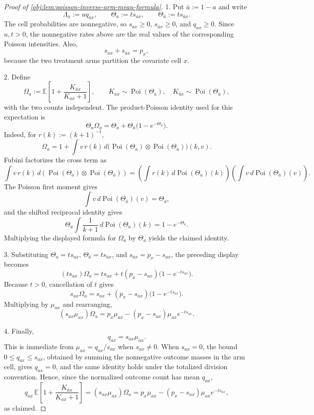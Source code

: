 \documentclass[11pt]{article}
\begin{document}
\begin{proof}[Proof of \cref{obj:lem:poisson-inverse-arm-mean-formula}]
1.  Put \(\bar a:=1-a\) and write
\[
\Lambda_a:=u q_{ax},\qquad
\Theta_a:=t s_{ax},\qquad
\Theta_{\bar a}:=t s_{\bar a x}.
\]
The cell probabilities are nonnegative, so \(s_{ax}\ge0\), \(s_{\bar a x}\ge0\), and \(q_{ax}\ge0\). Since \(u,t>0\), the nonnegative rates above are the real values of the corresponding Poisson intensities. Also,
\[
s_{ax}+s_{\bar a x}=p_x,
\]
because the two treatment arms partition the covariate cell \(x\). %

2.  Define
\[
\Omega_a:=
\mathbb E\!\left[
1+\frac{K_{\bar a x}}{K_{ax}+1}
\right],
\qquad
K_{ax}\sim\operatorname{Poi}(\Theta_a),\quad
K_{\bar a x}\sim\operatorname{Poi}(\Theta_{\bar a}),
\]
with the two counts independent. The product-Poisson identity used for this expectation is
\[
\Theta_a\Omega_a
=
\Theta_a+\Theta_{\bar a}\bigl(1-e^{-\Theta_a}\bigr).
\]
Indeed, for \(r(k):=(k+1)^{-1}\),
\[
\Omega_a
=
1+
\int v\,r(k)\,
d\bigl(\operatorname{Poi}(\Theta_a)\otimes\operatorname{Poi}(\Theta_{\bar a})\bigr)(k,v).
\]
Fubini factorizes the cross term as
\[
\int v\,r(k)\,d(\operatorname{Poi}(\Theta_a)\otimes\operatorname{Poi}(\Theta_{\bar a}))
=
\left(\int r(k)\,d\operatorname{Poi}(\Theta_a)(k)\right)
\left(\int v\,d\operatorname{Poi}(\Theta_{\bar a})(v)\right).
\]
The Poisson first moment gives
\[
\int v\,d\operatorname{Poi}(\Theta_{\bar a})(v)=\Theta_{\bar a},
\]
and the shifted reciprocal identity gives
\[
\Theta_a\int \frac{1}{k+1}\,d\operatorname{Poi}(\Theta_a)(k)
=
1-e^{-\Theta_a}.
\]
Multiplying the displayed formula for \(\Omega_a\) by \(\Theta_a\) yields the claimed identity. %

3.  Substituting \(\Theta_a=t s_{ax}\), \(\Theta_{\bar a}=t s_{\bar a x}\), and \(s_{\bar a x}=p_x-s_{ax}\), the preceding display becomes
\[
(t s_{ax})\Omega_a
=
t s_{ax}
+
t(p_x-s_{ax})\bigl(1-e^{-t s_{ax}}\bigr).
\]
Because \(t>0\), cancellation of \(t\) gives
\[
s_{ax}\Omega_a
=
s_{ax}
+
(p_x-s_{ax})\bigl(1-e^{-t s_{ax}}\bigr).
\]
Multiplying by \(\mu_{ax}\) and rearranging,
\[
(s_{ax}\mu_{ax})\Omega_a
=
p_x\mu_{ax}
-
(p_x-s_{ax})\mu_{ax}e^{-t s_{ax}}.
\]

4.  Finally,
\[
q_{ax}=s_{ax}\mu_{ax}.
\]
This is immediate from \(\mu_{ax}=q_{ax}/s_{ax}\) when \(s_{ax}\ne0\). When \(s_{ax}=0\), the bound \(0\le q_{ax}\le s_{ax}\), obtained by summing the nonnegative outcome masses in the arm cell, gives \(q_{ax}=0\), and the same identity holds under the totalized division convention. Hence, since the normalized outcome count has mean \(q_{ax}\),
\[
q_{ax}\,
\mathbb E\!\left[1+\frac{K_{\bar a x}}{K_{ax}+1}\right]
=
(s_{ax}\mu_{ax})\Omega_a
=
p_x\mu_{ax}
-
(p_x-s_{ax})\mu_{ax}e^{-t s_{ax}},
\]
as claimed. %
\end{proof}
\end{document}
